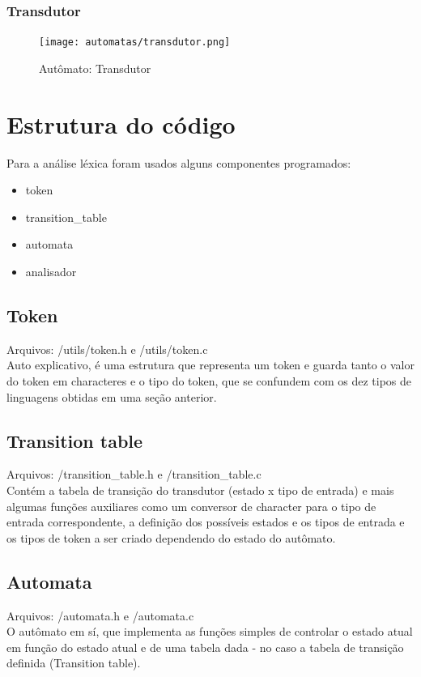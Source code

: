 \subsubsection{Transdutor}
\begin{figure}[H]
\texttt{[image: automatas/transdutor.png]}
\caption{\label{fig:transdutor} Autômato: Transdutor}
\end{figure}

\section{Estrutura do código}

Para a análise léxica foram usados alguns componentes programados:
\begin{itemize}
\item{token}
\item{transition\_table}
\item{automata}
\item{analisador}
\end{itemize}

\subsection{Token}
Arquivos: /utils/token.h e /utils/token.c\\
Auto explicativo, é uma estrutura que representa um token e guarda tanto o valor do token em characteres e o tipo do token, que se confundem com os dez tipos de linguagens obtidas em uma seção anterior.

\subsection{Transition table}
Arquivos: /transition\_table.h e /transition\_table.c\\
Contém a tabela de transição do transdutor (estado x tipo de entrada) e mais algumas funções auxiliares como um conversor de character para o tipo de entrada correspondente, a definição dos possíveis estados e os tipos de entrada e os tipos de token a ser criado dependendo do estado do autômato.

\subsection{Automata}
Arquivos: /automata.h e /automata.c\\
O autômato em sí, que implementa as funções simples de controlar o estado atual em função do estado atual e de uma tabela dada - no caso a tabela de transição definida (Transition table).


